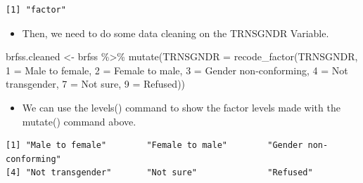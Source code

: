 \documentclass[
  letterpaper,
  DIV=11,
  numbers=noendperiod]{scrreprt}
\newenvironment{Shaded}{\begin{snugshade}}{\end{snugshade}}
\newcommand{\AttributeTok}[1]{\textcolor[rgb]{0.40,0.45,0.13}{#1}}
\newcommand{\FunctionTok}[1]{\textcolor[rgb]{0.28,0.35,0.67}{#1}}
\newcommand{\NormalTok}[1]{\textcolor[rgb]{0.00,0.23,0.31}{#1}}
\newcommand{\OtherTok}[1]{\textcolor[rgb]{0.00,0.23,0.31}{#1}}
\newcommand{\SpecialCharTok}[1]{\textcolor[rgb]{0.37,0.37,0.37}{#1}}
\newcommand{\StringTok}[1]{\textcolor[rgb]{0.13,0.47,0.30}{#1}}
\providecommand{\tightlist}{%
  \setlength{\itemsep}{0pt}\setlength{\parskip}{0pt}}\usepackage{longtable,booktabs,array}
\begin{document}
\begin{verbatim}
[1] "factor"
\end{verbatim}

\begin{itemize}
\tightlist
\item
  Then, we need to do some data cleaning on the TRNSGNDR Variable.
\end{itemize}

\begin{Shaded}
\begin{Highlighting}[]
\NormalTok{brfss.cleaned }\OtherTok{\textless{}{-}}\NormalTok{ brfss }\SpecialCharTok{\%\textgreater{}\%} 
  \FunctionTok{mutate}\NormalTok{(}\AttributeTok{TRNSGNDR =} \FunctionTok{recode\_factor}\NormalTok{(TRNSGNDR,}
      \StringTok{\textquotesingle{}1\textquotesingle{}} \OtherTok{=} \StringTok{\textquotesingle{}Male to female\textquotesingle{}}\NormalTok{,}
      \StringTok{\textquotesingle{}2\textquotesingle{}} \OtherTok{=} \StringTok{\textquotesingle{}Female to male\textquotesingle{}}\NormalTok{,}
      \StringTok{\textquotesingle{}3\textquotesingle{}} \OtherTok{=} \StringTok{\textquotesingle{}Gender non{-}conforming\textquotesingle{}}\NormalTok{,}
      \StringTok{\textquotesingle{}4\textquotesingle{}} \OtherTok{=} \StringTok{\textquotesingle{}Not transgender\textquotesingle{}}\NormalTok{,}
      \StringTok{\textquotesingle{}7\textquotesingle{}} \OtherTok{=} \StringTok{\textquotesingle{}Not sure\textquotesingle{}}\NormalTok{,}
      \StringTok{\textquotesingle{}9\textquotesingle{}} \OtherTok{=} \StringTok{\textquotesingle{}Refused\textquotesingle{}}\NormalTok{))}
\end{Highlighting}
\end{Shaded}

\begin{itemize}
\tightlist
\item
  We can use the levels() command to show the factor levels made with
  the mutate() command above.
\end{itemize}

\begin{Shaded}
\end{Shaded}

\begin{verbatim}
[1] "Male to female"        "Female to male"        "Gender non-conforming"
[4] "Not transgender"       "Not sure"              "Refused"              
\end{verbatim}
\end{document}
